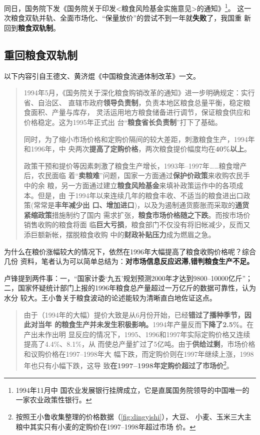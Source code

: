 同日，国务院下发《国务院关于印发<粮食风险基金实施意见>的通知》\footnote{1994年11月中
  国农业发展银行挂牌成立，它是直属国务院领导的中国唯一的一家农业政策性银行。}。
这一次粮食双轨并轨、全面市场化、“保量放价”的尝试不到一年就\textbf{失败}了，我国重
新回到\textbf{粮食双轨制}。


\subsection{重回粮食双轨制}

以下内容引自王德文、黄济焜《中国粮食流通体制改革》一文。
\begin{quotation}
  1994年5月，《国务院关于深化粮食购销改革的通知》进一步明确规定：实行省、自治区、
  直辖市政府\textbf{领导负责制}，负责本地区粮食总量平衡，稳定粮食面积、产量与库存，
  灵活运用地方粮食储备进行调节，保证粮食供应和价格稳定。这为1995年正式出
  台“\textbf{粮食省长负责制}”打下了基础。

  同时，为了缩小市场价格和定购价隔间的较大差距，刺激粮食生产，1994年和1996年，中
  央两次\textbf{提高了定购价格}，两次粮食提价幅度均在\textbf{40\%以上}。

  政策干预和提价等因素刺激了粮食生产增长，1993年--1997年……粮食增产后，农民面临
  着“\textbf{卖粮难}”问题，国家一方面通过\textbf{保护价政策}来收购农民手中的余
  粮，另一方面通过建立\textbf{粮食风险基金}来填补政策运作中的各项成本。但是，由
  于1994年以来连续几年的粮食丰收、不适当的粮食进出口政策(常常是\textbf{丰年减少出
    口、增加进口})，以及为遏制通货膨胀而采取的\textbf{通货紧缩政策}措施制约了国内
  需求扩张，\textbf{粮食市场价格随之下跌}。而按市场价销售收购的粮食将面
  临\textbf{巨大亏损}，粮食部门不仅没有将旧帐减少，反而又添巨额新帐，摆脱粮食收购
  中的\textbf{财政补贴压力}成为燃眉之急。
\end{quotation}

为什么在粮价涨幅较大的情况下，依然在1996年大幅提高了粮食收购价格呢？综合几份
资料，笔者认为可以简单总结为：\textbf{对市场信息反应迟滞,错判粮食生产不足。}

卢锋提到两件事：一，“国家计委‘九五’规划预测2000年才达到9800--10000亿斤”；
二，国家怀疑统计部门上报的1996年粮食总产量超过一万亿斤的数据可靠性，认为水分
较大。王小鲁关于粮食波动的论述能较为清晰直白地佐证这点。
\begin{quotation}
  由于（1994年的大幅）提价大致是从6月份开始，已经\textbf{错过了播种季节，因此对当年
    的粮食生产并未发生积极影响。}1994年产量反而\textbf{下降了2.5\%}。在产出未作出明
  显反应的情况下，1995、1996和1997年实际定购价格又连续提高了4.4\%、8.1\%，从
  而使总产量扩过了5亿吨。由于\textbf{供给过剩}，市场价格和议购价格在1997--1998年大
  幅下跌，而定购价则在1997年继续上涨，1998年也只有小幅下跌，这导
  致\textbf{在1997--1998年定购价超过了市场价}\footnote{按照王小鲁收集整理的价格数据（\cref{fig:dingyishi}），大豆、
    小麦、玉米三大主粮中其实只有小麦的定购价在1997--1998年超过市场
    价。}。\cite{wangxiaoluliangshi}
\end{quotation}

